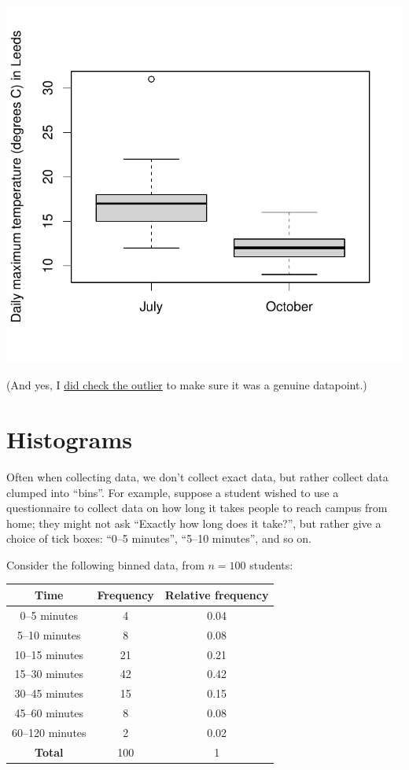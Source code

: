 \documentclass[
  a4paper,
]{book}
\theoremstyle{definition}
\theoremstyle{definition}
\theoremstyle{definition}
\theoremstyle{definition}
\theoremstyle{remark}
\begin{document}
\begin{center}\includegraphics{math1710_files/figure-latex/boxplot-temp-1} \end{center}

(And yes, I \href{https://www.metoffice.gov.uk/binaries/content/assets/metofficegovuk/pdf/weather/learn-about/uk-past-events/interesting/2020/2020_05_july_temperature.pdf}{did check the outlier} to make sure it was a genuine datapoint.)

\hypertarget{histograms}{%
\section{Histograms}\label{histograms}}

Often when collecting data, we don't collect exact data, but rather collect data clumped into ``bins''. For example, suppose a student wished to use a questionnaire to collect data on how long it takes people to reach campus from home; they might not ask ``Exactly how long does it take?'', but rather give a choice of tick boxes: ``0--5 minutes'', ``5--10 minutes'', and so on.

Consider the following binned data, from \(n = 100\) students:

\begin{longtable}[]{@{}ccc@{}}
\toprule()
Time & Frequency & Relative frequency \\
\midrule()
\endhead
0--5 minutes & 4 & 0.04 \\
5--10 minutes & 8 & 0.08 \\
10--15 minutes & 21 & 0.21 \\
15--30 minutes & 42 & 0.42 \\
30--45 minutes & 15 & 0.15 \\
45--60 minutes & 8 & 0.08 \\
60--120 minutes & 2 & 0.02 \\
\textbf{Total} & 100 & 1 \\
\bottomrule()
\end{longtable}
\end{document}

